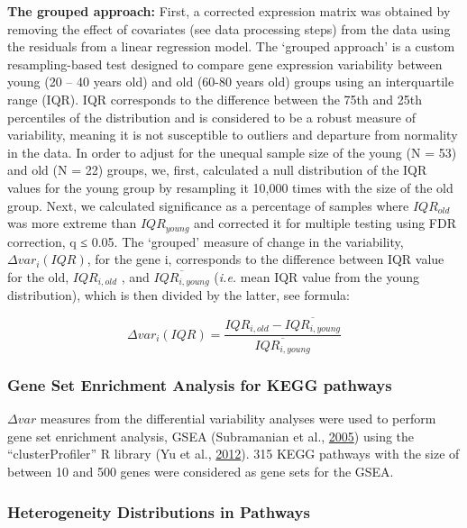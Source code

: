 \documentclass[12pt,twoside]{unicam}
\begin{document}
\textbf{The grouped approach:} First, a corrected expression matrix was obtained by removing the effect of covariates (see data processing steps) from the data using the residuals from a linear regression model. The `grouped approach' is a custom resampling-based test designed to compare gene expression variability between young (20 -- 40 years old) and old (60-80 years old) groups using an interquartile range (IQR). IQR corresponds to the difference between the 75th and 25th percentiles of the distribution and is considered to be a robust measure of variability, meaning it is not susceptible to outliers and departure from normality in the data. In order to adjust for the unequal sample size of the young (N = 53) and old (N = 22) groups, we, first, calculated a null distribution of the IQR values for the young group by resampling it 10,000 times with the size of the old group. Next, we calculated significance as a percentage of samples where \(IQR_{old}\) was more extreme than \(IQR_{young}\) and corrected it for multiple testing using FDR correction, q ≤ 0.05. The `grouped' measure of change in the variability, \(\Delta var_i(IQR)\), for the gene i, corresponds to the difference between IQR value for the old, \(IQR_{i,old}\) , and \(\overline{IQR_{i,young}}\) (\emph{i.e.} mean IQR value from the young distribution), which is then divided by the latter, see formula:

\[\Delta var_i(IQR) = \dfrac{IQR_{i,old} - \overline{IQR_{i,young}}}{\overline{IQR_{i,young}}}\]

\hypertarget{gene-set-enrichment-analysis-for-kegg-pathways}{%
\subsubsection{Gene Set Enrichment Analysis for KEGG pathways}\label{gene-set-enrichment-analysis-for-kegg-pathways}}

\(\Delta var\) measures from the differential variability analyses were used to perform gene set enrichment analysis, GSEA (Subramanian et al., \protect\hyperlink{ref-Subramanian2005}{2005}) using the ``clusterProfiler'' R library (Yu et al., \protect\hyperlink{ref-Yu2012}{2012}). 315 KEGG pathways with the size of between 10 and 500 genes were considered as gene sets for the GSEA.

\hypertarget{heterogeneity-distributions-in-pathways}{%
\subsubsection{Heterogeneity Distributions in Pathways}\label{heterogeneity-distributions-in-pathways}}
\end{document}
